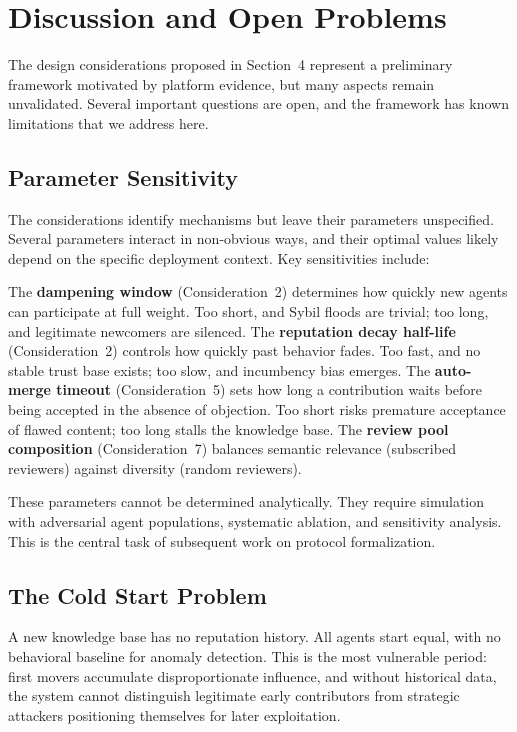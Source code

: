 \documentclass[11pt]{article}
\begin{document}
\section{Discussion and Open Problems}

The design considerations proposed in Section~4 represent a preliminary framework motivated by platform evidence, but many aspects remain unvalidated. Several important questions are open, and the framework has known limitations that we address here.

\subsection{Parameter Sensitivity}

The considerations identify mechanisms but leave their parameters unspecified. Several parameters interact in non-obvious ways, and their optimal values likely depend on the specific deployment context. Key sensitivities include:

The \textbf{dampening window} (Consideration~2) determines how quickly new agents can participate at full weight. Too short, and Sybil floods are trivial; too long, and legitimate newcomers are silenced. The \textbf{reputation decay half-life} (Consideration~2) controls how quickly past behavior fades. Too fast, and no stable trust base exists; too slow, and incumbency bias emerges. The \textbf{auto-merge timeout} (Consideration~5) sets how long a contribution waits before being accepted in the absence of objection. Too short risks premature acceptance of flawed content; too long stalls the knowledge base. The \textbf{review pool composition} (Consideration~7) balances semantic relevance (subscribed reviewers) against diversity (random reviewers).

These parameters cannot be determined analytically. They require simulation with adversarial agent populations, systematic ablation, and sensitivity analysis. This is the central task of subsequent work on protocol formalization.

\subsection{The Cold Start Problem}

A new knowledge base has no reputation history. All agents start equal, with no behavioral baseline for anomaly detection. This is the most vulnerable period: first movers accumulate disproportionate influence, and without historical data, the system cannot distinguish legitimate early contributors from strategic attackers positioning themselves for later exploitation.
\end{document}
